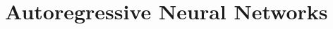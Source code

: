 \documentclass[a4]{article}
\begin{document}
\section{Autoregressive Neural Networks}
\end{document}
